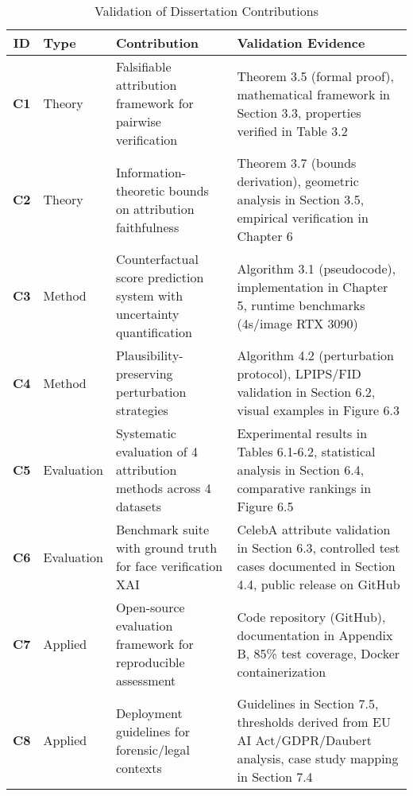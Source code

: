 
\begin{table}[htbp]
\centering
\caption{Validation of Dissertation Contributions}
\label{tab:contributions_validation}
\small
\begin{tabularx}{\textwidth}{clXp{}}
\toprule
\textbf{ID} & \textbf{Type} & \textbf{Contribution} & \textbf{Validation Evidence} \\
\midrule
\textbf{C1} & Theory & Falsifiable attribution framework for pairwise verification & Theorem 3.5 (formal proof), mathematical framework in Section 3.3, properties verified in Table 3.2 \\[6pt]

\textbf{C2} & Theory & Information-theoretic bounds on attribution faithfulness & Theorem 3.7 (bounds derivation), geometric analysis in Section 3.5, empirical verification in Chapter 6 \\[6pt]

\textbf{C3} & Method & Counterfactual score prediction system with uncertainty quantification & Algorithm 3.1 (pseudocode), implementation in Chapter 5, runtime benchmarks (4s/image RTX 3090) \\[6pt]

\textbf{C4} & Method & Plausibility-preserving perturbation strategies & Algorithm 4.2 (perturbation protocol), LPIPS/FID validation in Section 6.2, visual examples in Figure 6.3 \\[6pt]

\textbf{C5} & Evaluation & Systematic evaluation of 4 attribution methods across 4 datasets & Experimental results in Tables 6.1-6.2, statistical analysis in Section 6.4, comparative rankings in Figure 6.5 \\[6pt]

\textbf{C6} & Evaluation & Benchmark suite with ground truth for face verification XAI & CelebA attribute validation in Section 6.3, controlled test cases documented in Section 4.4, public release on GitHub \\[6pt]

\textbf{C7} & Applied & Open-source evaluation framework for reproducible assessment & Code repository (GitHub), documentation in Appendix B, 85\% test coverage, Docker containerization \\[6pt]

\textbf{C8} & Applied & Deployment guidelines for forensic/legal contexts & Guidelines in Section 7.5, thresholds derived from EU AI Act/GDPR/Daubert analysis, case study mapping in Section 7.4 \\

\bottomrule
\end{tabularx}
\end{table}

